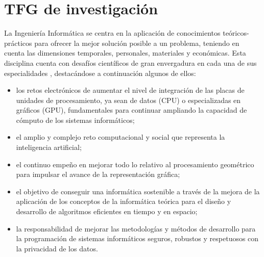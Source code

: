 \section{TFG de investigación}
\label{appendix:investigacion}


La Ingeniería Informática se centra en la aplicación de conocimientos teóricos-prácticos para ofrecer la mejor solución posible a un problema, teniendo en cuenta las dimensiones temporales, personales, materiales y económicas. Esta disciplina cuenta con desafíos científicos de gran envergadura en cada una de sus especialidades \cite{Zwart2022}, destacándose a continuación algunos de ellos:
\begin{itemize}
    \item los retos electrónicos de aumentar el nivel de integración de las placas de unidades de procesamiento, ya sean de datos (CPU) o especializadas en gráficos (GPU), fundamentales para continuar ampliando la capacidad de cómputo de los sistemas informáticos;
    \item el amplio y complejo reto computacional y social que representa la inteligencia artificial;
    \item el continuo empeño en mejorar todo lo relativo al procesamiento geométrico para impulsar el avance de la representación gráfica;
    \item el objetivo de conseguir una informática sostenible a través de la mejora de la aplicación de los conceptos de la informática teórica para el diseño y desarrollo de algoritmos eficientes en tiempo y en espacio;
    \item la responsabilidad de mejorar las metodologías y métodos de desarrollo para la programación de sistemas informáticos seguros, robustos y respetuosos con la privacidad de los datos.
\end{itemize}


